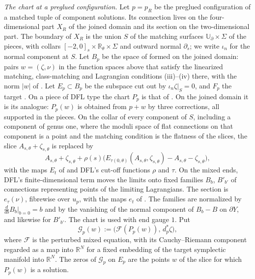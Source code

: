 \documentclass[11pt]{amsart}
\theoremstyle{definition}
\theoremstyle{remark}
\theoremstyle{plain}
\numberwithin{equation}{section}
\newcommand{\RR}{\mathbb{R}}
\begin{document}
\emph{The chart at a preglued configuration.} Let $p=p_R$ be the preglued
configuration of a matched tuple of component solutions. Its connection lives
on the four-dimensional part $X_R$ of the joined domain and its section on the
two-dimensional part. The boundary of $X_R$ is the union $S$ of the matching
surfaces $\mathbb U_\partial\times\Sigma$ of the pieces, with collars
$[-2,0]_s\times\RR_\theta\times\Sigma$ and outward normal $\partial_s$; we write
$\iota_n$ for the normal component at $S$. Let $B_p$ be the space of
\cite[Section~4.1]{DFL} formed on the joined domain: pairs $w=(\zeta,\nu)$ in
the function spaces above that satisfy the linearized matching,
class-matching and Lagrangian conditions (iii)--(iv) there, with the norm
$|w|$ of \cite[(4.5)]{DFL}. Let $E_p\subset B_p$ be the subspace cut out by
$\iota_n\zeta|_S=0$, and $F_p$ the target \cite[(4.8)]{DFL}. On a piece of
DFL type the chart $P_p$ is that of \cite[Section~4.1]{DFL}. On the joined
domain it is its analogue: $P_p(w)$ is obtained from $p+w$ by three
corrections, all supported in the pieces. On the collar of every component
of $S$, including a component of genus one, where the moduli space of flat
connections on that component is a point and the matching condition is the flatness
of the slices, the slice $A_{s,\theta}+\zeta_{s,\theta}$ is replaced by
\[
A_{s,\theta}+\zeta_{s,\theta}+\rho(s)\bigl(E_{\tau(0,\theta)}(A_{s,\theta},\zeta_{s,\theta})
-A_{s,\theta}-\zeta_{s,\theta}\bigr),
\]
with the maps $E_t$ of \cite[Lemma~4.1 and the paragraph after
Lemma~4.4]{DFL} and DFL's cut-off functions $\rho$ and $\tau$. On the mixed
ends, DFL's finite-dimensional term moves the limits onto fixed families
$B_b$, $B'_{b'}$ of connections representing points of the limiting
Lagrangians. The section is $e_\tau(\nu)$, fibrewise over $u_p$, with the maps
$e_t$ of \cite[Lemma~4.4]{DFL}. The families are
normalized by $\frac{d}{db}B_b|_{b=0}=b$ and by the vanishing of the normal
component of $B_b-B$ on $\partial Y$, and likewise for $B'_{b'}$. The chart is
used with end gauge $1$. Put
\[
\mathcal G_p(w):=\bigl(\mathcal F(P_p(w)),\,d_p^*\zeta\bigr),
\]
where $\mathcal F$ is the perturbed mixed equation, with its Cauchy--Riemann
component regarded as a map into $\RR^N$ for a fixed embedding of the target
symplectic manifold into $\RR^N$. The zeros of $\mathcal G_p$ on $E_p$ are the
points $w$ of the slice \cite[(4.7)]{DFL} for which $P_p(w)$ is a solution.
\end{document}
